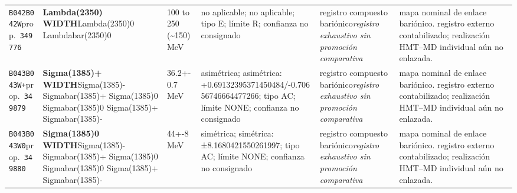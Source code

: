 \begin{landscape}
\begin{longtable}{L{1.85cm}L{4.45cm}L{2.35cm}L{4.05cm}L{3.35cm}L{7.15cm}}
\texttt{B042}\newline \texttt{B042W}\newline prop.\ \texttt{349776} & \textbf{Lambda(2350) WIDTH}\newline Lambda(2350)0 \textbar{}\allowbreak{} Lambdabar(2350)0 & 100 to 250 (\textasciitilde{}150)\,MeV & no aplicable; no aplicable; tipo E; límite R; confianza no consignado & registro compuesto bariónico\newline \emph{registro exhaustivo sin promoción comparativa} & mapa nominal de enlace bariónico. registro externo contabilizado; realización HMT--MD individual aún no enlazada. \\
\texttt{B043}\newline \texttt{B043W+}\newline prop.\ \texttt{349879} & \textbf{Sigma(1385)+ WIDTH}\newline Sigma(1385)- \textbar{}\allowbreak{} Sigmabar(1385)+ \textbar{}\allowbreak{} Sigma(1385)0 \textbar{}\allowbreak{} Sigmabar(1385)0 \textbar{}\allowbreak{} Sigma(1385)+ \textbar{}\allowbreak{} Sigmabar(1385)- & 36.2+-0.7\,MeV & asimétrica; asimétrica: +0.69132395371450484/-0.70656746664477266; tipo AC; límite NONE; confianza no consignado & registro compuesto bariónico\newline \emph{registro exhaustivo sin promoción comparativa} & mapa nominal de enlace bariónico. registro externo contabilizado; realización HMT--MD individual aún no enlazada. \\
\texttt{B043}\newline \texttt{B043W0}\newline prop.\ \texttt{349880} & \textbf{Sigma(1385)0 WIDTH}\newline Sigma(1385)- \textbar{}\allowbreak{} Sigmabar(1385)+ \textbar{}\allowbreak{} Sigma(1385)0 \textbar{}\allowbreak{} Sigmabar(1385)0 \textbar{}\allowbreak{} Sigma(1385)+ \textbar{}\allowbreak{} Sigmabar(1385)- & 44+-8\,MeV & simétrica; simétrica: ±8.1680421550261997; tipo AC; límite NONE; confianza no consignado & registro compuesto bariónico\newline \emph{registro exhaustivo sin promoción comparativa} & mapa nominal de enlace bariónico. registro externo contabilizado; realización HMT--MD individual aún no enlazada. \\

\end{longtable}
\end{landscape}
